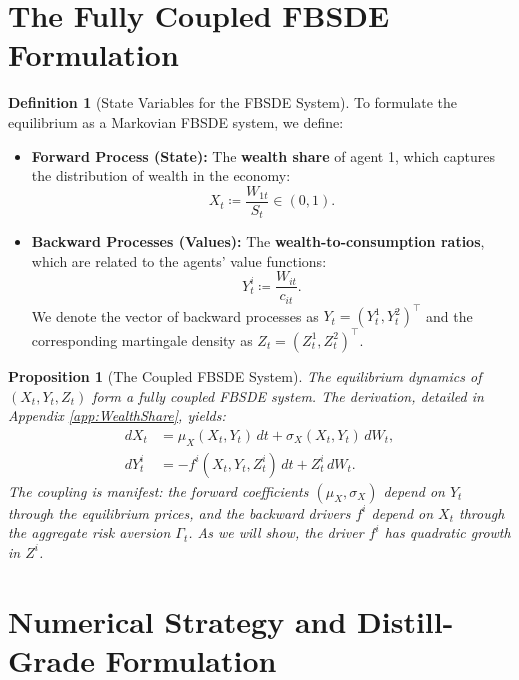 \documentclass[11pt,letterpaper,oneside]{article}
\theoremstyle{plain}
\newtheorem{proposition}[theorem]{Proposition}
\theoremstyle{definition}
\newtheorem{definition}[theorem]{Definition}
\theoremstyle{remark}
\begin{document}
\section{The Fully Coupled FBSDE Formulation}
\label{sec:GE_FBSDE_new}

\begin{definition}[State Variables for the FBSDE System]
To formulate the equilibrium as a Markovian FBSDE system, we define:
\begin{itemize}
    \item \textbf{Forward Process (State):} The \textbf{wealth share} of agent 1, which captures the distribution of wealth in the economy:
    \begin{equation}\label{eq:wealth_share_def_new_main}
      X_t \coloneqq \frac{W_{1t}}{S_t} \in (0,1).
    \end{equation}
    \item \textbf{Backward Processes (Values):} The \textbf{wealth-to-consumption ratios}, which are related to the agents' value functions:
    \begin{equation}\label{eq:WC_ratio_def_new_main}
        Y^i_t \coloneqq \frac{W_{it}}{c_{it}}.
    \end{equation}
    We denote the vector of backward processes as \(Y_t = (Y^1_t, Y^2_t)^\top\) and the corresponding martingale density as \(Z_t = (Z^1_t, Z^2_t)^\top\).
\end{itemize}
\end{definition}

\begin{proposition}[The Coupled FBSDE System]
The equilibrium dynamics of \((X_t, Y_t, Z_t)\) form a fully coupled FBSDE system. The derivation, detailed in Appendix \ref{app:WealthShare}, yields:
\begin{align}
  dX_t &= \mu_X(X_t, Y_t)\,dt + \sigma_X(X_t, Y_t)\,dW_t, \label{eq:wealth_share_SDE_new_main} \\
  dY^i_t &= -f^i(X_t, Y_t, Z^i_t)\,dt + Z^i_t\,dW_t. \label{eq:BSDE_Y_i_new_main}
\end{align}
The coupling is manifest: the forward coefficients \((\mu_X, \sigma_X)\) depend on \(Y_t\) through the equilibrium prices, and the backward drivers \(f^i\) depend on \(X_t\) through the aggregate risk aversion \(\Gamma_t\). As we will show, the driver $f^i$ has quadratic growth in $Z^i$.
\end{proposition}

\section{Numerical Strategy and Distill-Grade Formulation}
\label{sec:GE_numerical_strategy_new}
\end{document}
